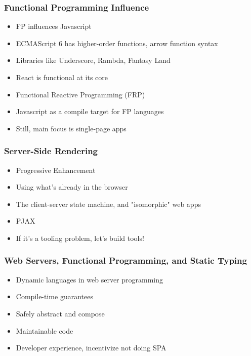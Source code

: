 \begin{frame}
  \frametitle{Functional Programming Influence}
  \begin{itemize}
    \pause
    \item<+-> FP influences Javascript
    \item<+-> ECMAScript 6 has higher-order functions, arrow function syntax
    \item<+-> Libraries like Underscore, Rambda, Fantasy Land
    \item<+-> React is functional at its core
    \item<+-> Functional Reactive Programming (FRP)
    \item<+-> Javascript as a compile target for FP languages
    \item<+-> Still, main focus is single-page apps
  \end{itemize}
\end{frame}

\begin{frame}
\end{frame}

\begin{frame}
  \frametitle{Server-Side Rendering}
  \begin{itemize}
    \pause
    \item<+-> Progressive Enhancement
    \item<+-> Using what's already in the browser
    \item<+-> The client-server state machine, and "isomorphic" web apps
    \item<+-> PJAX
    \item<+-> If it's a tooling problem, let's build tools!
  \end{itemize}
\end{frame}

\begin{frame}
\end{frame}

\begin{frame}
  \frametitle{Web Servers, Functional Programming, and Static Typing}
  \begin{itemize}
    \pause
    \item<+-> Dynamic languages in web server programming
    \item<+-> Compile-time guarantees
    \item<+-> Safely abstract and compose
    \item<+-> Maintainable code
    \item<+-> Developer experience, incentivize not doing SPA
  \end{itemize}
\end{frame}

